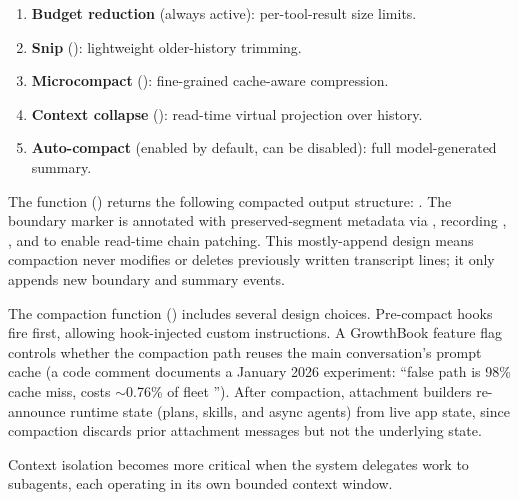 \begin{enumerate}[nosep]
  \item \textbf{Budget reduction} (always active): per-tool-result size limits.
  \item \textbf{Snip} (): lightweight older-history trimming.
  \item \textbf{Microcompact} (): fine-grained cache-aware compression.
  \item \textbf{Context collapse} (): read-time virtual projection over history.
  \item \textbf{Auto-compact} (enabled by default, can be disabled): full model-generated summary.
\end{enumerate}

The  function () returns the following compacted output structure: . The boundary marker is annotated with preserved-segment metadata via , recording , , and  to enable read-time chain patching. This mostly-append design means compaction never modifies or deletes previously written transcript lines; it only appends new boundary and summary events.

The compaction function  () includes several design choices. Pre-compact hooks fire first, allowing hook-injected custom instructions. A GrowthBook feature flag controls whether the compaction path reuses the main conversation's prompt cache (a code comment documents a January 2026 experiment: ``false path is 98\% cache miss, costs $\sim$0.76\% of fleet ''). After compaction, attachment builders re-announce runtime state (plans, skills, and async agents) from live app state, since compaction discards prior attachment messages but not the underlying state.

Context isolation becomes more critical when the system delegates work to subagents, each operating in its own bounded context window.
